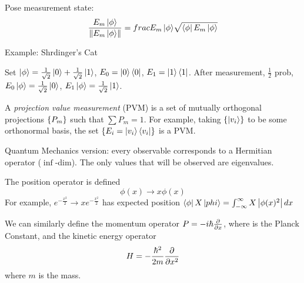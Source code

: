 \begin{enumerate}[label=Postulate \arabic*.]
          Pose measurement state: \[\frac{E_m\left|\phi\right\rangle}{\left\lVert E_m\left|\phi\right\rangle\right\rVert} = frac{E_m\left|\phi\right\rangle}{\sqrt{\left\langle \phi\right|E_m\left|\phi\right\rangle}}\]

          Example: Shrdinger's Cat %

          Set $\left|\phi\right\rangle = \frac{1}{\sqrt{2}}\left|0\right\rangle + \frac{1}{\sqrt{2}}\left|1\right\rangle$,
          $E_0 = \left|0\right\rangle\left\langle 0\right|$, $E_1 = \left|1\right\rangle\left\langle 1\right|$. After measurement, $\frac{1}{2}$
          prob, $E_0\left|\phi\right\rangle = \frac{1}{\sqrt{2}}\left|0\right\rangle$, $E_1\left|\phi\right\rangle = \frac{1}{\sqrt{2}}\left|1\right\rangle$.

          A \emph{projection value measurement} (PVM) is a set of mutually orthogonal projections
          $\left\lbrace P_m\right\rbrace$ such that $\sum P_m = 1$. For example, taking $\left\lbrace\left|v_i\right\rangle\right\rbrace$ to be some
          orthonormal basis, the set $\left\lbrace E_i = \left|v_i\right\rangle\left\langle v_i\right|\right\rbrace$ is a PVM.

          Quantum Mechanics version: every observable corresponds to a Hermitian operator ($\inf$-dim).
          The only values that will be observed are eigenvalues.

          \begin{example}
              The position operator is defined
              \[\phi(x) \to x\phi(x)\]
              For example,
              $e^{-\frac{x^2}{2}} \to xe^{-\frac{x^2}{2}}$
              has expected position $\left\langle \phi\right|X\left|phi\right\rangle=\int_{-\infty}^{\infty}X\left\lvert\phi(x)^2\right\rvert dx$
          \end{example}
          We can similarly define the momentum operator $P = -i\hbar\frac{\partial}{\partial x}$, where
          \planck is the Planck Constant, and the kinetic energy operator
          \[H = -\frac{\hbar^2}{2m}\frac{\partial}{\partial x^2}\] where $m$ is the
          mass.


\end{enumerate}
